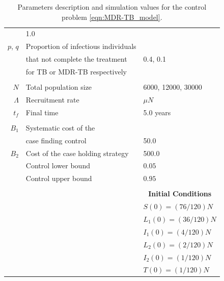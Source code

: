 \begin{table}[b]
\begin{tabular}{rll}
			& \num{1.0}
     	    \\
     	    $p$, $q$
     	    & Proportion of infectious individuals 
     	    \\
     	    & that not complete the treatment  
     	    & \num{0.4}, \num{0.1}
     	    \\
     	    & for TB or MDR-TB respectively
		\\
		\\	
			$N$ 
			& Total population size
			& 
			\num{6000}, 
			\num{12000}, 
			\num{30000}
            \\
			$\Lambda$ 
				& Recruitment rate
				& $\mu N$
            \\
            $t_f$ 
            & Final time 
            & \num{5.0} years
      \\
      \\
     	    $B_1$ 
     	    & Systematic cost of the 
     	    \\
     	    & case finding  control
     	    & \num{50.0}
			\\
     	    $B_2$
     	    & 
     	    Cost of the case holding strategy
     	    & \num{500.0}
     	    \\
     	    & Control lower bound  & $0.05$
			\\
          & Control upper bound & $0.95$
       		\\
       		\\
		&&\multicolumn{1}{c}{\textbf{Initial Conditions}}
		\\
		\cmidrule{3-3}
		&&	
		$S(0) = (76/120)N$
		\\
		&&
		$L_1(0) = (36/120) N$
		\\
		&&
		$I_1(0) = (4/120)N$
		\\
		&&
		$L_2(0) =(2/120) N$
		\\
		&&
		$I_2(0) = (1/120)N$
		\\
		&&
		$T(0)= (1/120)N$
		\\
		\bottomrule
    \end{tabular}
	\caption{Parameters description and simulation values for the control 
	problem \eqref{eqn:MDR-TB_model}.}
	\label{tbl:parameters_MDR-TB_model}
\end{table}


